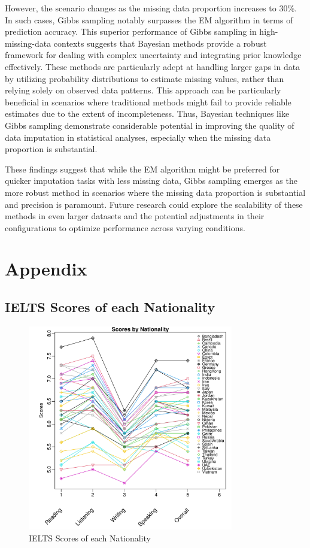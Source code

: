 \documentclass[12pt]{article}
\begin{document}
However, the scenario changes as the missing data proportion increases to 30\%. In such cases, Gibbs sampling notably surpasses the EM algorithm in terms of prediction accuracy. This superior performance of Gibbs sampling in high-missing-data contexts suggests that Bayesian methods provide a robust framework for dealing with complex uncertainty and integrating prior knowledge effectively. These methods are particularly adept at handling larger gaps in data by utilizing probability distributions to estimate missing values, rather than relying solely on observed data patterns. This approach can be particularly beneficial in scenarios where traditional methods might fail to provide reliable estimates due to the extent of incompleteness. Thus, Bayesian techniques like Gibbs sampling demonstrate considerable potential in improving the quality of data imputation in statistical analyses, especially when the missing data proportion is substantial.

These findings suggest that while the EM algorithm might be preferred for quicker imputation tasks with less missing data, Gibbs sampling emerges as the more robust method in scenarios where the missing data proportion is substantial and precision is paramount. Future research could explore the scalability of these methods in even larger datasets and the potential adjustments in their configurations to optimize performance across varying conditions.

\printbibliography

\newpage

\section{Appendix}
\subsection{IELTS Scores of each Nationality}
\begin{figure}[htpb]
	\centering
	\includegraphics[width=0.8\textwidth]{pic/IELTS.pdf}
	\caption{IELTS Scores of each Nationality}
	\label{fig:IELTS}
\end{figure}
\end{document}
